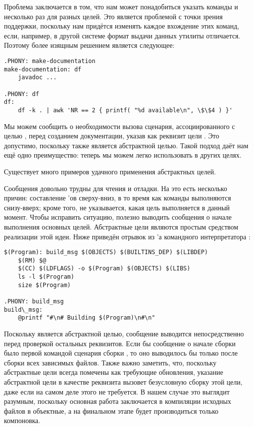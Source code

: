 Проблема заключается в том, что нам может понадобиться указать
команды  и  несколько раз для разных целей.
Это является проблемой с точки зрения поддержки, поскольку нам
придётся изменять каждое вхождение этих команд, если, например, в
другой системе формат выдачи данных утилиты  отличается.
Поэтому более изящным решением является следующее:

{\footnotesize
\begin{verbatim}
.PHONY: make-documentation
make-documentation: df
    javadoc ...

.PHONY: df
df:
    df -k . | awk 'NR == 2 { printf( "%d available\n", \$\$4 ) }'
\end{verbatim}
}

Мы можем сообщить \GNUmake{} о необходимости вызова сценария,
ассоциированного с целью , перед созданием документации,
указав  как реквизит цели . Это
допустимо, поскольку  также является
абстрактной целью. Такой подход даёт нам ещё одно преимущество: теперь
мы можем легко использовать  в других целях.

Существует много примеров удачного применения абстрактных целей.

Сообщения \GNUmake{} довольно трудны для чтения и отладки. На это есть
несколько причин: составление \Makefile{}'ов сверху\hyp{}вниз, в то
время как команды выполняются снизу\hyp{}вверх; кроме того, не
указывается, какая цель выполняется в данный момент. Чтобы исправить
ситуацию, полезно выводить сообщения о начале выполнения основных
целей. Абстрактные цели являются простым средством реализации этой
идеи. Ниже приведён отрывок из \Makefile{}'а командного интерпретатора
:

{\footnotesize
\begin{verbatim}
$(Program): build_msg $(OBJECTS) $(BUILTINS_DEP) $(LIBDEP)
    $(RM) $@
    $(CC) $(LDFLAGS) -o $(Program) $(OBJECTS) $(LIBS)
    ls -l $(Program)
    size $(Program)

.PHONY: build_msg
build\_msg:
    @printf "#\n# Building $(Program)\n#\n"
\end{verbatim}
}

Поскольку  является абстрактной целью, сообщение
выводится непосредственно перед проверкой остальных реквизитов.  Если
бы сообщение о начале сборки было первой командой сценария сборки
, то оно выводилось бы только после сборки всех
зависимых файлов. Также важно заметить, что, поскольку абстрактные цели
всегда помечены как требующие обновления, указание абстрактной цели
 в качестве реквизита 
вызовет безусловную сборку этой цели, даже если на самом деле
этого не требуется. В нашем случае это выглядит разумным, поскольку
основная работа заключается в компиляции исходных файлов в объектные,
а на финальном этапе будет производиться только компоновка.

